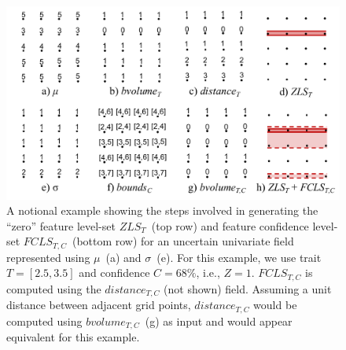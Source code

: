\begin{figure}[!b]
\centering
\includegraphics[width=\linewidth, trim={1cm 0cm 0.33cm 0cm}, clip]{Images/example_narrow.pdf}
\caption{A notional example showing the steps involved in generating the ``zero'' feature level-set $ZLS_{T}$~(top row) and feature confidence level-set $FCLS_{T,C}$~(bottom row) for an uncertain univariate field represented using ${\mu}$~(a) and ${\sigma}$~(e). 
%
For this example, we use trait $T=[2.5, 3.5]$ and confidence $C=68\%$, i.e., $Z=1$.
%
$FCLS_{T,C}$ is computed using the $distance_{T,C}$ (not shown) field.
%
Assuming a unit distance between adjacent grid points,
%
$distance_{T,C}$ would be computed using $bvolume_{T,C}$~(g) as input and would appear equivalent for this example.
}
\label{fig:example}
\end{figure}
